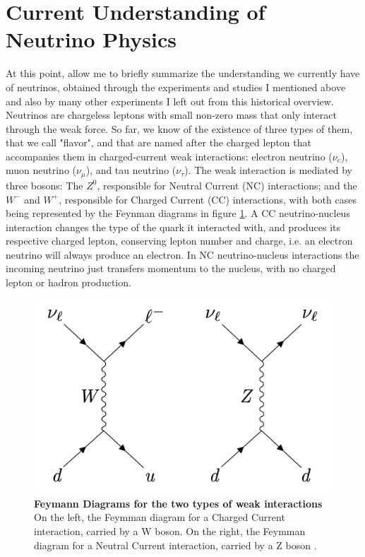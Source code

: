 \section{Current Understanding of Neutrino Physics}
%
At this point, allow me to briefly summarize the understanding we currently have of neutrinos, obtained through the experiments and studies I mentioned above and also by many other experiments I left out from this historical overview. 
%
Neutrinos are chargeless leptons with small non-zero mass that only interact through the weak force. So far, we know of the existence of three types of them, that we call "flavor", and that are named after the charged lepton that accompanies them in charged-current weak interactions: electron neutrino ($\nu_e$), muon neutrino ($\nu_{\mu}$), and tau neutrino ($\nu_{\tau}$). 
%
The weak interaction is mediated by three bosons: The $Z^{0}$, responsible for Neutral Current (NC) interactions; and the $W^{-}$ and $W^{+}$, responsible for Charged Current (CC) interactions, with both cases being represented by the Feynman diagrams in figure \ref{feymann_diag}. A CC neutrino-nucleus interaction changes the type of the quark it interacted with, and produces its respective charged lepton, conserving lepton number and charge, i.e. an electron neutrino will always produce an electron. In NC neutrino-nucleus interactions the incoming neutrino just transfers momentum to the nucleus, with no charged lepton or hadron production.
%
\begin{figure}[h!]
	\begin{center}
		\includegraphics[scale=0.3]{Figures/feymann_diag.jpg}
		\caption[Feynman diagrams for the two types of weak interactions]{ {\textbf{Feymann Diagrams for the two types of weak interactions}} \\ On the left, the Feymman diagram for a Charged Current interaction, carried by a W boson. On the right, the Feymman diagram for a Neutral Current interaction, carried by a Z boson \cite{Lauren_thesis}.}
		\label{feymann_diag}	
	\end{center}
\end{figure}
